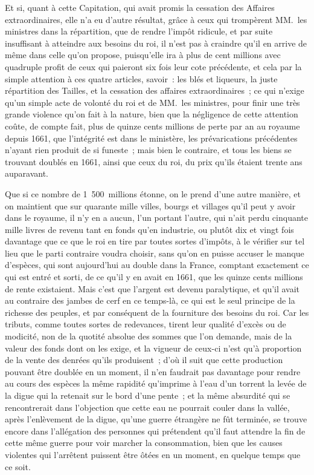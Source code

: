 \documentclass[french,twoside]{book} %
\begin{document}
Et si, quant à cette Capitation, qui avait promis la cessation des Affaires extraordinaires, elle n’a eu d’autre résultat, grâce à ceux qui trompèrent MM. les ministres dans la répartition, que de rendre l’impôt ridicule, et par suite insuffisant à atteindre aux besoins du roi, il n’est pas à craindre qu’il en arrive de même dans celle qu’on propose, puisqu’elle ira à plus de cent millions avec quadruple profit de ceux qui paieront six fois leur cote précédente, et cela par la simple attention à ces quatre articles, savoir : les blés et liqueurs, la juste répartition des Tailles, et la cessation des affaires extraordinaires ; ce qui n’exige qu’un simple acte de volonté du roi et de MM. les ministres, pour finir une très grande violence qu’on fait à la nature, bien que la négligence de cette attention coûte, de compte fait, plus de quinze cents millions de perte par an au royaume depuis 1661, que l’intégrité est dans le ministère, les prévarications précédentes n’ayant rien produit de si funeste ; mais bien le contraire, et tous les biens se trouvant doublés en 1661, ainsi que ceux du roi, du prix qu’ils étaient trente ans auparavant.\par
Que si ce nombre de 1 500 millions étonne, on le prend d’une autre manière, et on maintient que sur quarante mille villes, bourgs et villages qu’il peut y avoir dans le royaume, il n’y en a aucun, l’un portant l’autre, qui n’ait perdu cinquante mille livres de revenu tant en fonds qu’en industrie, ou plutôt dix et vingt fois davantage que ce que le roi en tire par toutes sortes d’impôts, à le vérifier sur tel lieu que le parti contraire voudra choisir, sans qu’on en puisse accuser le manque d’espèces, qui sont aujourd’hui au double dans la France, comptant exactement ce qui est entré et sorti, de ce qu’il y en avait en 1661, que les quinze cents millions de rente existaient. Mais c’est que l’argent est devenu paralytique, et qu’il avait au contraire des jambes de cerf en ce temps-là, ce qui est le seul principe de la richesse des peuples, et par conséquent de la fourniture des besoins du roi. Car les tributs, comme toutes sortes de redevances, tirent leur qualité d’excès ou de modicité, non de la quotité absolue des sommes que l’on demande, mais de la valeur des fonds dont on les exige, et la vigueur de ceux-ci n’est qu’à proportion de la vente des denrées qu’ils produisent ; d’où il suit que cette production pouvant être doublée en un moment, il n’en faudrait pas davantage pour rendre au cours des espèces la même rapidité qu’imprime à l’eau d’un torrent la levée de la digue qui la retenait sur le bord d’une pente ; et la même absurdité qui se rencontrerait dans l’objection que cette eau ne pourrait couler dans la vallée, après l’enlèvement de la digue, qu’une guerre étrangère ne fût terminée, se trouve encore dans l’allégation des personnes qui prétendent qu’il faut attendre la fin de cette même guerre pour voir marcher la consommation, bien que les causes violentes qui l’arrêtent puissent être ôtées en un moment, en quelque temps que ce soit.\par
\end{document}
